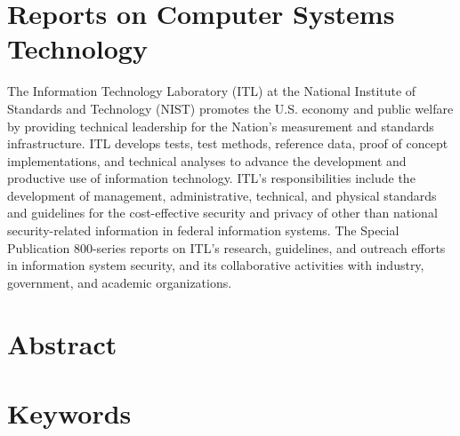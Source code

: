 \section*{Reports on Computer Systems Technology}

The Information Technology Laboratory (ITL) at the National Institute of Standards and Technology (NIST) promotes the U.S. economy and public welfare by providing technical leadership for the Nation’s measurement and standards infrastructure. ITL develops tests, test methods, reference data, proof of concept implementations, and technical analyses to advance the development and productive use of information technology. ITL’s responsibilities include the development of management, administrative, technical, and physical standards and guidelines for the cost-effective security and privacy of other than national security-related information in federal information systems. The Special Publication 800-series reports on ITL’s research, guidelines, and outreach efforts in information system security, and its collaborative activities with industry, government, and academic organizations.

\section*{Abstract}


\section*{Keywords} 

